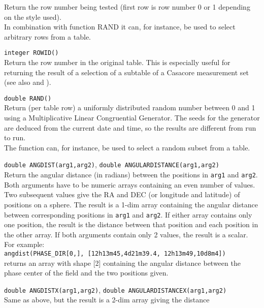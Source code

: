 \begin{description}
    Return the row number being tested (first row is row number 0 or 1
    depending on the style used).
    \\In combination with function RAND it can, for instance,
    be used to select arbitrary rows from a table.
  \item[] \texttt{integer ROWID()}\\
    Return the row number in the original table. This is especially
    useful for returning the result of a selection of a subtable
    of a Casacore measurement set
    (see also 
    and ).
  \item[] \texttt{double RAND()}\\
    Return (per table row) a uniformly distributed random number
    between 0 and 1 using a Multiplicative Linear Congruential Generator.
    The seeds for the generator are deduced from the current date and
    time, so the results are different from run to run.
    \\The function can, for instance, be used to select a random
    subset from a table.
  \item[] \texttt{double ANGDIST(arg1,arg2)},
              \texttt{double ANGULARDISTANCE(arg1,arg2)}\\
    Return the angular distance (in radians) between the
    positions in \texttt{arg1} and \texttt{arg2}. Both arguments have
    to be numeric arrays containing an even number of values. Two subsequent values 
    give the RA and DEC (or longitude and latitude) of positions on a
    sphere. The result is a 1-dim array containing the angular
    distance between corresponding positions in \texttt{arg1} and
    \texttt{arg2}.
    If either array contains only one position, the result is the
    distance between that position and each position in the other array.
    If both arguments contain only 2 values, the result is a scalar.
    For example:
    \\\texttt{angdist(PHASE\_DIR[0,], [12h13m45,4d21m39.4, 12h13m49,10d8m4])}
    \\returns an array with shape [2] containing the angular
    distance between the phase center of the field and the two positions given. 
  \item[] \texttt{double ANGDISTX(arg1,arg2)},
              \texttt{double ANGULARDISTANCEX(arg1,arg2)}\\
    Same as above, but the result is a 2-dim array giving the distance

\end{description}
